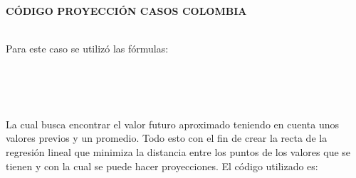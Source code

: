 \documentclass[conference,compsoc,onecolumn]{IEEEtran}
\begin{document}
\begin{figure}[htbp]
\centering
{}
\label{fig:lego}
\end{figure}
\\\

\textbf{CÓDIGO PROYECCIÓN CASOS COLOMBIA}
\\\

Para este caso se utilizó las fórmulas:
\\\

\begin{figure}[htbp]
\centering
{}
\label{fig:lego}
\end{figure}
\\\

La cual busca encontrar el valor futuro aproximado teniendo en cuenta unos valores previos y un promedio. Todo esto con el fin de crear la recta de la regresión lineal que minimiza la distancia entre los puntos de los valores que se tienen y con la cual se puede hacer proyecciones. El código utilizado es:
\\\
\end{document}
